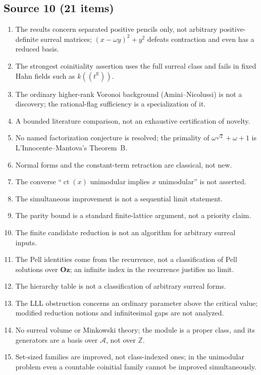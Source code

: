 \documentclass[11pt,oneside]{article}
\numberwithin{equation}{section}
\theoremstyle{definition}
\theoremstyle{remark}
\newcommand{\Oz}{\mathbf{Oz}}
\newcommand{\Z}{\mathbb Z}
\newcommand{\R}{\mathbb R}
\newcommand{\A}{\mathcal A}
\newcommand{\ct}{\operatorname{ct}}
\begin{document}
\subsection{Source 10 (21 items)}
\begin{enumerate}[leftmargin=*,widest=00,label=10.\arabic*]
\item The results concern separated positive pencils only, not arbitrary
positive-definite surreal matrices; $(x-\omega y)^2+y^2$ defeats contraction and
even has a reduced basis.
\item The strongest coinitiality assertion uses the full surreal class and fails in
fixed Hahn fields such as $k((t^\R))$.
\item The ordinary higher-rank Voronoi background (Amini--Nicolussi) is not a
discovery; the rational-flag sufficiency is a specialization of it.
\item A bounded literature comparison, not an exhaustive certification of novelty.
\item No named factorization conjecture is resolved; the primality of
$\omega^{\sqrt2}+\omega+1$ is L'Innocente--Mantova's Theorem~B.
\item Normal forms and the constant-term retraction are classical, not new.
\item The converse ``$\ct(x)$ unimodular implies $x$ unimodular'' is not asserted.
\item The simultaneous improvement is not a sequential limit statement.
\item The parity bound is a standard finite-lattice argument, not a priority
claim.
\item The finite candidate reduction is not an algorithm for arbitrary surreal
inputs.
\item The Pell identities come from the recurrence, not a classification of Pell
solutions over $\Oz$; an infinite index in the recurrence justifies no limit.
\item The hierarchy table is not a classification of arbitrary surreal forms.
\item The LLL obstruction concerns an ordinary parameter above the critical value;
modified reduction notions and infinitesimal gaps are not analyzed.
\item No surreal volume or Minkowski theory; the module is a proper class, and its
generators are a basis over $\A$, not over $\Z$.
\item Set-sized families are improved, not class-indexed ones; in the unimodular
problem even a countable coinitial family cannot be improved simultaneously.

\end{enumerate}
\end{document}
